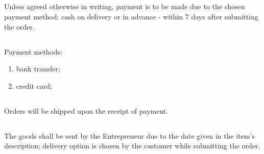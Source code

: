 
		\subsection{} Unless agreed otherwise in writing, payment is to be made due to the chosen payment method: cash on delivery or in advance - within 7 days after submitting the order.

		\subsection{} Payment methods:
			\begin{enumerate}[label=(\alph*)]
				\item bank transfer;
				\item credit card;
			\end{enumerate}
		
			\subsection{} Orders will be shipped upon the receipt of payment.
			
			\subsection{} The goods shall be sent by the Entrepreneur due to the date given in the item’s description; delivery option is chosen by the customer while submitting the order.
	 
